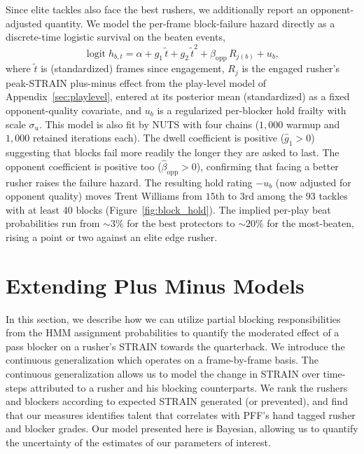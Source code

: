\documentclass[USenglish]{article}
\theoremstyle{dgthm}
\theoremstyle{dgdef}
\begin{document}
Since elite tackles also face the best rushers, we additionally report an opponent-adjusted quantity. We model the per-frame block-failure hazard directly as a discrete-time logistic survival on the beaten events,
$$ \operatorname{logit} h_{b,t} = \alpha + g_1\,\tilde t + g_2\,\tilde t^{2} + \beta_{\text{opp}}\,R_{j(b)} + u_b, $$
where $\tilde t$ is (standardized) frames since engagement, $R_{j}$ is the engaged rusher's peak-STRAIN plus-minus effect from the play-level model of Appendix~\ref{sec:playlevel}, entered at its posterior mean (standardized) as a fixed opponent-quality covariate, and $u_b$ is a regularized per-blocker hold frailty with scale $\sigma_u$. This model is also fit by NUTS with four chains ($1{,}000$ warmup and $1{,}000$ retained iterations each). The dwell coefficient is positive ($\hat{g}_1 > 0$) suggesting that blocks fail more readily the longer they are asked to last. The opponent coefficient is positive too ($\hat{\beta}_{\text{opp}} > 0$), confirming that facing a better rusher raises the failure hazard. The resulting hold rating $-u_b$ (now adjusted for opponent quality) moves Trent Williams from $15$th to $3$rd among the $93$ tackles with at least $40$ blocks (Figure~\ref{fig:block_hold}). The implied per-play beat probabilities run from $\sim\!3\%$ for the best protectors to $\sim\!20\%$ for the most-beaten, rising a point or two against an elite edge rusher.


\section{Extending Plus Minus Models} \label{plusminus}

In this section, we describe how we can utilize partial blocking responsibilities from the HMM assignment probabilities to quantify the moderated effect of a pass blocker on a rusher's STRAIN towards the quarterback. We introduce the continuous generalization which operates on a frame-by-frame basis. The continuous generalization allows us to model the change in STRAIN over time-steps attributed to a rusher and his blocking counterparts. We rank the rushers and blockers according to expected STRAIN generated (or prevented), and find that our measures identifies talent that correlates with PFF's hand tagged rusher and blocker grades.  Our model presented here is Bayesian, allowing us to quantify the uncertainty of the estimates of our parameters of interest. 

\end{document}
